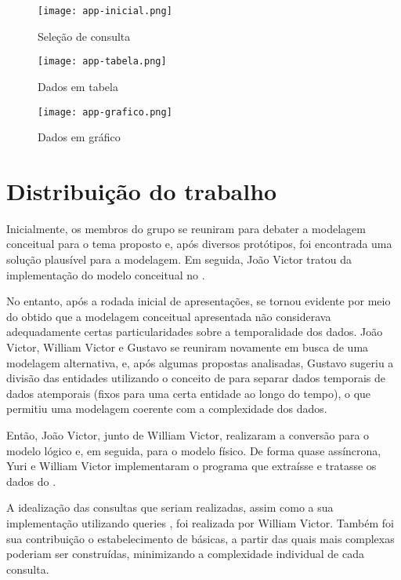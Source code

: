   \begin{figure}[H]
    \centering
    \texttt{[image: app-inicial.png]}
    \caption{Seleção de consulta}
  \end{figure}

  \begin{figure}[H]
    \centering
    \texttt{[image: app-tabela.png]}
    \caption{Dados em tabela}
  \end{figure}

  \begin{figure}[H]
    \centering
    \texttt{[image: app-grafico.png]}
    \caption{Dados em gráfico}
  \end{figure}

\chapter{Distribuição do trabalho}

   Inicialmente, os membros do grupo se reuniram para debater a modelagem conceitual para o tema proposto e, após diversos
   protótipos, foi encontrada uma solução plausível para a modelagem. Em seguida, João Victor tratou da implementação do
   modelo conceitual no .

   No entanto, após a rodada inicial de apresentações,
   se tornou evidente por meio do  obtido que a modelagem conceitual apresentada não considerava adequadamente
   certas particularidades sobre a temporalidade dos dados. João Victor, William Victor e Gustavo se reuniram novamente em busca de
   uma modelagem alternativa, e, após algumas propostas analisadas, Gustavo sugeriu a divisão das entidades utilizando o conceito
   de  para separar dados temporais de dados atemporais (fixos para uma certa entidade ao longo do tempo),
   o que permitiu uma modelagem coerente com a complexidade dos dados.

   Então, João Victor, junto de William Victor, realizaram a conversão para o modelo lógico e, em seguida, para o modelo
   físico. De forma quase assíncrona, Yuri e William Victor implementaram o programa que extraísse e tratasse os dados do
   .

   A idealização das consultas que seriam realizadas, assim como a sua implementação utilizando queries ,
   foi realizada por William Victor. Também foi sua contribuição o estabelecimento de  básicas, a partir das quais
    mais complexas poderiam ser construídas, minimizando a complexidade individual de cada consulta.

